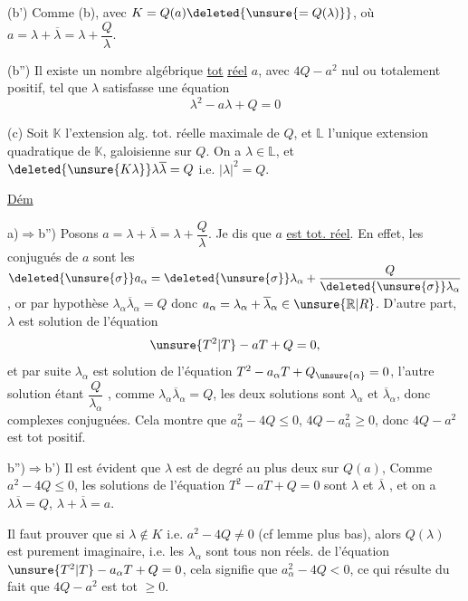 (b') Comme (b), avec $K=Q(a)\deleted{\unsure{=Q(\lambda)}}$, où $a=\lambda+\overline\lambda=\lambda+\dfrac Q\lambda$.

(b'') Il existe un nombre algébrique  \uline{tot} \uline{réel} $a$, avec  $4Q-a^2$ nul ou totalement positif, tel que $\lambda$ satisfasse une équation
\[
\lambda^2-a\lambda+Q=0
\]

(c) Soit $\mathbb K$ l'extension alg. tot. réelle maximale de $Q$, et $\mathbb L$ l'unique extension quadratique de $\mathbb K$, galoisienne sur $Q$. On a $\lambda\in\mathbb L$, et $\deleted{\unsure{K\lambda}}\lambda\overline\lambda=Q$ i.e. $|\lambda|^2=Q$.

\uline{Dém}

a)$\Longrightarrow$b'') Posons $a=\lambda+\overline\lambda=\lambda+\dfrac Q\lambda$. Je dis que $a$ \uline{est tot. réel}. En effet, les conjugués de $a$ sont les $\deleted{\unsure{\sigma}}a_\alpha=\deleted{\unsure{\sigma}}\lambda_\alpha+\dfrac Q{\deleted{\unsure{\sigma}}\lambda_\alpha}$, or par hypothèse $\lambda_\alpha\overline\lambda_\alpha=Q$ donc $a_\alpha=\lambda_\alpha+\overline\lambda_\alpha\in\unsure{\mathbb R|R}$. D'autre part, $\lambda$ est solution de l'équation
\[
\unsure{T^2|T}-aT+Q=0,
\]
et par suite $\lambda_\alpha$ est solution de l'équation $T^2-a_\alpha T+Q_{\unsure{\alpha}}=0$,  l'autre solution étant $\dfrac Q{\lambda_\alpha}$ ,  comme $\lambda_\alpha\overline\lambda_\alpha=Q$, les deux solutions sont $\lambda_\alpha$ et $\overline\lambda_\alpha$, donc complexes conjuguées. Cela montre que $a_\alpha^2-4Q\le0$,   $4Q-a_\alpha^2\ge0$, donc $4Q-a^2$ est tot positif.

b'')$\Longrightarrow$b') Il est évident que $\lambda$ est de degré au plus deux sur  $Q(a)$,     Comme $a^2-4Q\le0$, les solutions de l'équation $T^2-aT+Q=0$ sont $\lambda$ et $\overline\lambda$ , et on a $\lambda\overline\lambda=Q$, $\lambda+\overline\lambda=a$.

 Il faut prouver que si $\lambda\notin K$ i.e. $a^2-4Q\ne0$ (cf lemme plus bas), alors  $Q(\lambda)$ est purement imaginaire, i.e. les $\lambda_\alpha$ sont tous non réels.   de l'équation $\unsure{T^2|T}-a_\alpha T+Q=0$, cela signifie que $a_\alpha^2-4Q<0$, ce qui résulte du fait que $4Q-a^2$ est tot $\ge0$.

